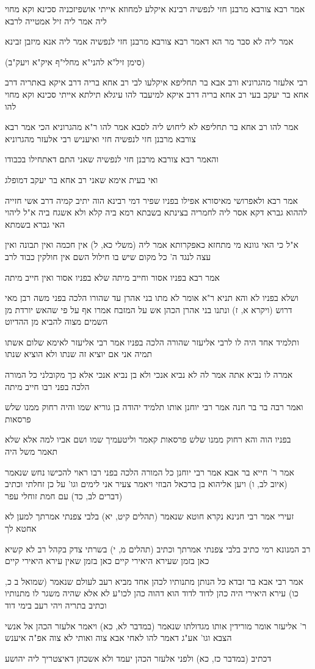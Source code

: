 \documentclass[12pt, openany]{book}
\newcommand{\sethebfont}{
\fontsize{10.5pt}{21.0pt} \selectfont
}
\newcommand{\textblock}[1]{
{\sethebfont #1\\}	
}
\begin{document}
\textblock{אמר רבא צורבא מרבנן חזי לנפשיה רבינא איקלע למחוזא אייתי אושפיזכניה סכינא וקא מחוי ליה אמר ליה זיל אמטייה לרבא}
\textblock{אמר ליה לא סבר מר הא דאמר רבא צורבא מרבנן חזי לנפשיה אמר ליה אנא מיזבן זבינא}
\textblock{(סימן זיל"א להני"א מחלי"ף איק"א ויעק"ב)}
\textblock{רבי אלעזר מהגרוניא ורב אבא בר תחליפא איקלעו לבי רב אחא בריה דרב איקא באתריה דרב אחא בר יעקב בעי רב אחא בריה דרב איקא למיעבד להו עיגלא תילתא אייתי סכינא וקא מחוי להו}
\textblock{אמר להו רב אחא בר תחליפא לא ליחוש ליה לסבא אמר להו ר"א מהגרוניא הכי אמר רבא צורבא מרבנן חזי לנפשיה חזי ואיעניש רבי אלעזר מהגרוניא}
\textblock{והאמר רבא צורבא מרבנן חזי לנפשיה שאני התם דאתחילו בכבודו}
\textblock{ואי בעית אימא שאני רב אחא בר יעקב דמופלג}
\textblock{אמר רבא ולאפרושי מאיסורא אפילו בפניו שפיר דמי רבינא הוה יתיב קמיה דרב אשי חזייה לההוא גברא דקא אסר ליה לחמריה בצינתא בשבתא רמא ביה קלא ולא אשגח ביה א"ל ליהוי האי גברא בשמתא}
\textblock{א"ל כי האי גוונא מי מתחזא כאפקרותא אמר ליה (משלי כא, ל) אין חכמה ואין תבונה ואין עצה לנגד ה' כל מקום שיש בו חילול השם אין חולקין כבוד לרב}
\textblock{אמר רבא בפניו אסור וחייב מיתה שלא בפניו אסור ואין חייב מיתה}
\textblock{ושלא בפניו לא והא תניא ר"א אומר לא מתו בני אהרן עד שהורו הלכה בפני משה רבן מאי דרוש (ויקרא א, ז) ונתנו בני אהרן הכהן אש על המזבח אמרו אף על פי שהאש יורדת מן השמים מצוה להביא מן ההדיוט}
\textblock{ותלמיד אחד היה לו לרבי אליעזר שהורה הלכה בפניו אמר רבי אליעזר לאימא שלום אשתו תמיה אני אם יוציא זה שנתו ולא הוציא שנתו}
\textblock{אמרה לו נביא אתה אמר לה לא נביא אנכי ולא בן נביא אנכי אלא כך מקובלני כל המורה הלכה בפני רבו חייב מיתה}
\textblock{ואמר רבה בר בר חנה אמר רבי יוחנן אותו תלמיד יהודה בן גוריא שמו והיה רחוק ממנו שלש פרסאות}
\textblock{בפניו הוה והא רחוק ממנו שלש פרסאות קאמר וליטעמיך שמו ושם אביו למה אלא שלא תאמר משל היה}
\textblock{אמר ר' חייא בר אבא אמר רבי יוחנן כל המורה הלכה בפני רבו ראוי להכישו נחש שנאמר (איוב לב, ו) ויען אליהוא בן ברכאל הבוזי ויאמר צעיר אני לימים וגו' על כן זחלתי וכתיב (דברים לב, כד) עם חמת זוחלי עפר}
\textblock{זעירי אמר רבי חנינא נקרא חוטא שנאמר (תהלים קיט, יא) בלבי צפנתי אמרתך למען לא אחטא לך}
\textblock{רב המנונא רמי כתיב בלבי צפנתי אמרתך וכתיב (תהלים מ, י) בשרתי צדק בקהל רב לא קשיא כאן בזמן שעירא היאירי קיים כאן בזמן שאין עירא היאירי קיים}
\textblock{אמר רבי אבא בר זבדא כל הנותן מתנותיו לכהן אחד מביא רעב לעולם שנאמר (שמואל ב כ, כו) עירא היאירי היה כהן לדוד לדוד הוא דהוה כהן לכו"ע לא אלא שהיה משגר לו מתנותיו וכתיב בתריה ויהי רעב בימי דוד}
\textblock{ר' אליעזר אומר מורידין אותו מגדולתו שנאמר (במדבר לא, כא) ויאמר אלעזר הכהן אל אנשי הצבא וגו' אע"ג דאמר להו לאחי אבא צוה ואותי לא צוה אפ"ה איענש}
\textblock{דכתיב (במדבר כז, כא) ולפני אלעזר הכהן יעמד ולא אשכחן דאיצטריך ליה יהושע}
\end{document}
